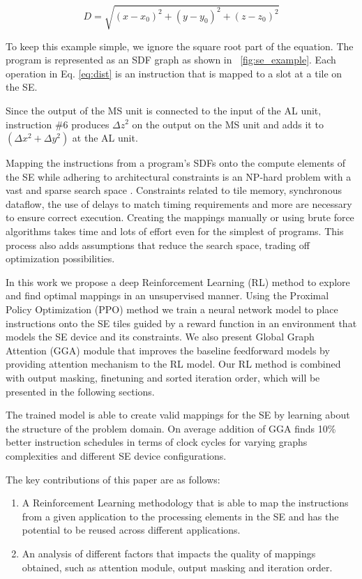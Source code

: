 \begin{equation}
    \label{eq:dist}
    D = \sqrt{(x - x_0)^2 +(y - y_0)^2 + (z - z_0)^2}
\end{equation}

To keep this example simple, we ignore the square root part of the equation.
The program is represented as an SDF graph as shown in \figurename~\ref{fig:se_example}.
Each operation in Eq. \ref{eq:dist} is an instruction that is mapped to a slot at a tile on the SE.

Since the output of the MS unit is connected to the input of the AL unit, instruction \#6 produces $\Delta z^2$ on the output on the MS unit and adds it to $(\Delta x^2 + \Delta y^2)$ at the AL unit.

Mapping the instructions from a program's SDFs onto the compute elements of the SE while adhering to architectural constraints is an NP-hard problem with a vast and sparse search space \cite{10.1007/3-540-69346-7_30}. 
Constraints related to tile memory, synchronous dataflow, the use of delays to match timing requirements and more are necessary to ensure correct execution. 
Creating the mappings manually or using brute force algorithms takes time and lots of effort even for the simplest of programs. 
This process also adds assumptions that reduce the search space, trading off optimization possibilities.  

In this work we propose a deep Reinforcement Learning (RL) method to explore and find optimal mappings in an unsupervised manner. 
Using the Proximal Policy Optimization (PPO) method we train a neural network model to place instructions onto the SE tiles guided by a reward function in an environment that models the SE device and its constraints. 
We also present Global Graph Attention (GGA) module that improves the baseline feedforward models by providing attention mechanism to the RL model.
Our RL method is combined with output masking, finetuning and sorted iteration order, which will be presented in the following sections.

The trained model is able to create valid mappings for the SE by learning about the structure of the problem domain.
On average addition of GGA finds 10\% better instruction schedules in terms of clock cycles for varying graphs complexities and different SE device configurations.

The key contributions of this paper are as follows:
\begin{enumerate}
    \item A Reinforcement Learning methodology that is able to map the instructions from a given application to the processing elements in the SE and has the potential to be reused across different applications.
    \item An analysis of different factors that impacts the quality of mappings obtained, such as attention module, output masking and iteration order.
\end{enumerate}

